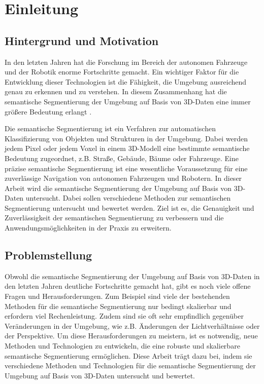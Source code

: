 \chapter{Einleitung}
\section{Hintergrund und Motivation}

In den letzten Jahren hat die Forschung im Bereich der autonomen Fahrzeuge und
der Robotik enorme Fortschritte gemacht. Ein wichtiger Faktor für die
Entwicklung dieser Technologien ist die Fähigkeit, die Umgebung ausreichend
genau zu erkennen und zu verstehen. In diesem Zusammenhang hat die semantische
Segmentierung der Umgebung auf Basis von 3D-Daten eine immer größere Bedeutung
erlangt \cite{.4242023b}. 

Die semantische Segmentierung ist ein Verfahren zur automatischen
Klassifizierung von Objekten und Strukturen in der Umgebung. Dabei werden jedem
Pixel oder jedem Voxel in einem 3D-Modell eine bestimmte semantische Bedeutung
zugeordnet, z.B. Straße, Gebäude, Bäume oder Fahrzeuge. Eine präzise
semantische Segmentierung ist eine wesentliche Voraussetzung für eine
zuverlässige Navigation von autonomen Fahrzeugen und Robotern.
In dieser Arbeit wird die semantische Segmentierung der Umgebung auf Basis von
3D-Daten untersucht. Dabei sollen verschiedene Methoden zur semantischen
Segmentierung untersucht und bewertet werden. Ziel ist es, die Genauigkeit und
Zuverlässigkeit der semantischen Segmentierung zu verbessern und die
Anwendungsmöglichkeiten in der Praxis zu erweitern.

\section{Problemstellung}

Obwohl die semantische Segmentierung der Umgebung auf Basis von 3D-Daten in den
letzten Jahren deutliche Fortschritte gemacht hat, gibt es noch viele offene
Fragen und Herausforderungen. Zum Beispiel sind viele der bestehenden Methoden
für die semantische Segmentierung nur bedingt skalierbar und erfordern viel
Rechenleistung. Zudem sind sie oft sehr empfindlich gegenüber Veränderungen in
der Umgebung, wie z.B. Änderungen der Lichtverhältnisse oder der Perspektive.
Um diese Herausforderungen zu meistern, ist es notwendig, neue Methoden und
Technologien zu entwickeln, die eine robuste und skalierbare semantische
Segmentierung ermöglichen. Diese Arbeit trägt dazu bei, indem sie verschiedene
Methoden und Technologien für die semantische Segmentierung der Umgebung auf
Basis von 3D-Daten untersucht und bewertet.


